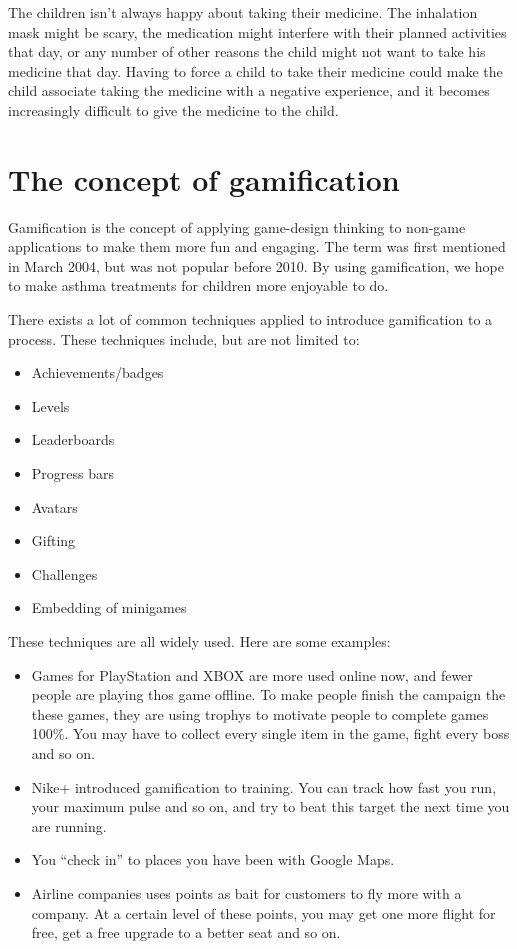 The children isn't always happy about taking their medicine. The inhalation mask might be scary, the 
medication might interfere with their planned activities that day, or any number of other reasons the child 
might not want to take his medicine that day. Having to force a child to take their medicine could make the 
child associate taking the medicine with a negative experience, and it becomes increasingly difficult to 
give the medicine to the child. 

\section{The concept of gamification}

Gamification is the concept of applying game-design thinking to non-game applications to make them more fun and engaging. The term
was first mentioned in March 2004, but was not popular before 2010. By using gamification, we hope to make asthma treatments for children
more enjoyable to do.


There exists a lot of common techniques applied to introduce gamification to a process. These techniques include, but are not limited to:
\begin{itemize}
  \item Achievements/badges
  \item Levels
  \item Leaderboards
  \item Progress bars
  \item Avatars
  \item Gifting
  \item Challenges
  \item Embedding of minigames
\end{itemize}

These techniques are all widely used. Here are some examples:
\begin{itemize}
  \item Games for PlayStation and XBOX are more used online now, and fewer people are playing thos game offline.
   To make people finish the campaign the these games, they are using trophys to motivate people to complete games 100\%. 
   You may have to collect every single item in the game, fight every boss and so on.
  \item Nike+ introduced gamification to training. You can track how fast you run, your maximum pulse and so on, and try to beat this target the next time you are running.
  \item You ``check in'' to places you have been with Google Maps.  
  \item Airline companies uses points as bait for customers to fly more with a company. At a certain level of these points, you may get one more flight for free, get a free upgrade to a better seat
  and so on. 
\end{itemize} 

